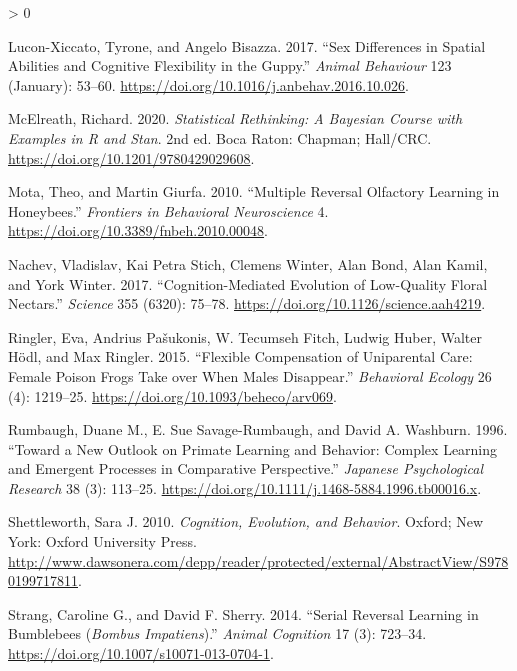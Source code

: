 \documentclass[
]{article}
\newlength{\cslhangindent}
\newenvironment{CSLReferences}[2] %
 {%
  \setlength{\parindent}{0pt}
  \ifodd #1 \everypar{\setlength{\hangindent}{\cslhangindent}}\ignorespaces\fi
  \ifnum #2 > 0
  \setlength{\parskip}{#2\baselineskip}
  \fi
 }%
 {}
\begin{document}
\begin{CSLReferences}{1}{0}
\leavevmode\hypertarget{ref-lucon-xiccato_sex_2017}{}%
Lucon-Xiccato, Tyrone, and Angelo Bisazza. 2017. {``Sex Differences in Spatial Abilities and Cognitive Flexibility in the Guppy.''} \emph{Animal Behaviour} 123 (January): 53--60. \url{https://doi.org/10.1016/j.anbehav.2016.10.026}.

\leavevmode\hypertarget{ref-mcelreath_statistical_2020}{}%
McElreath, Richard. 2020. \emph{Statistical {Rethinking}: {A} {Bayesian} {Course} with {Examples} in {R} and {Stan}}. 2nd ed. Boca Raton: Chapman; Hall/CRC. \url{https://doi.org/10.1201/9780429029608}.

\leavevmode\hypertarget{ref-mota_multiple_2010}{}%
Mota, Theo, and Martin Giurfa. 2010. {``Multiple {Reversal} {Olfactory} {Learning} in {Honeybees}.''} \emph{Frontiers in Behavioral Neuroscience} 4. \url{https://doi.org/10.3389/fnbeh.2010.00048}.

\leavevmode\hypertarget{ref-nachev_cognition-mediated_2017}{}%
Nachev, Vladislav, Kai Petra Stich, Clemens Winter, Alan Bond, Alan Kamil, and York Winter. 2017. {``Cognition-Mediated Evolution of Low-Quality Floral Nectars.''} \emph{Science} 355 (6320): 75--78. \url{https://doi.org/10.1126/science.aah4219}.

\leavevmode\hypertarget{ref-ringler_flexible_2015}{}%
Ringler, Eva, Andrius Pašukonis, W. Tecumseh Fitch, Ludwig Huber, Walter Hödl, and Max Ringler. 2015. {``Flexible Compensation of Uniparental Care: Female Poison Frogs Take over When Males Disappear.''} \emph{Behavioral Ecology} 26 (4): 1219--25. \url{https://doi.org/10.1093/beheco/arv069}.

\leavevmode\hypertarget{ref-rumbaugh_toward_1996}{}%
Rumbaugh, Duane M., E. Sue Savage-Rumbaugh, and David A. Washburn. 1996. {``Toward a New Outlook on Primate Learning and Behavior: Complex Learning and Emergent Processes in Comparative Perspective.''} \emph{Japanese Psychological Research} 38 (3): 113--25. \url{https://doi.org/10.1111/j.1468-5884.1996.tb00016.x}.

\leavevmode\hypertarget{ref-shettleworth_cognition_2010}{}%
Shettleworth, Sara J. 2010. \emph{Cognition, Evolution, and Behavior}. Oxford; New York: Oxford University Press. \url{http://www.dawsonera.com/depp/reader/protected/external/AbstractView/S9780199717811}.

\leavevmode\hypertarget{ref-strang_serial_2014}{}%
Strang, Caroline G., and David F. Sherry. 2014. {``Serial Reversal Learning in Bumblebees (\emph{{Bombus} Impatiens}).''} \emph{Animal Cognition} 17 (3): 723--34. \url{https://doi.org/10.1007/s10071-013-0704-1}.


\end{CSLReferences}
\end{document}
